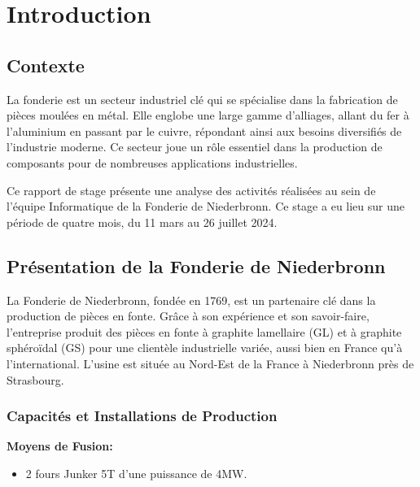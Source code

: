 \documentclass[12pt]{article}
\begin{document}

    





\section{Introduction }


\subsection{Contexte}


La fonderie est un secteur industriel clé qui se spécialise dans la 
fabrication de pièces moulées en métal. Elle englobe une large gamme 
d'alliages, allant du fer à l'aluminium en passant par le cuivre, 
répondant ainsi aux besoins diversifiés de l'industrie moderne. 
Ce secteur joue un rôle essentiel dans la production de composants 
pour de nombreuses applications industrielles.

Ce rapport de stage présente une analyse des activités réalisées 
au sein de l'équipe Informatique de la Fonderie de Niederbronn. Ce stage 
a eu lieu sur une période de quatre mois, du 11 mars au 26 juillet 2024. 



\subsection{Présentation de la Fonderie de Niederbronn}


La Fonderie de Niederbronn, fondée en 1769, est un partenaire clé dans la production de pièces 
en fonte. Grâce à son expérience et son savoir-faire, l'entreprise produit des pièces en fonte 
à graphite lamellaire (GL) et à graphite sphéroïdal (GS) pour une clientèle industrielle variée,
aussi bien en France qu'à l'international. L’usine est située au Nord-Est de la France 
à Niederbronn près de Strasbourg.



\subsubsection*{Capacités et Installations de Production}
\textbf{Moyens de Fusion:}
\begin{itemize}
    \item 2 fours Junker 5T d'une puissance de 4MW.
\end{itemize}
\end{document}
